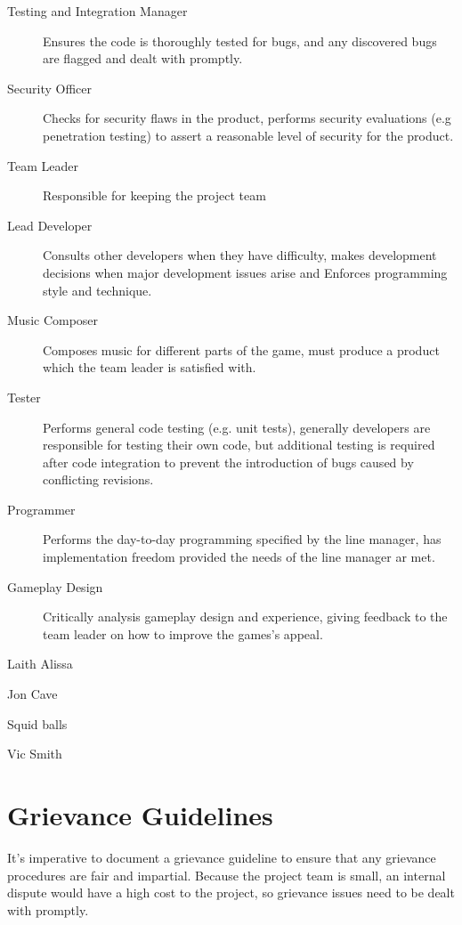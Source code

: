 \begin{description}
\item[Testing and Integration Manager] Ensures the code is thoroughly tested for bugs, and any discovered bugs are flagged and dealt with promptly. 

\item[Security Officer] Checks for security flaws in the product, performs security evaluations (e.g penetration testing) to assert a reasonable level of security for the product.

\item[Team Leader] Responsible for keeping the project team
 
\item[Lead Developer] Consults other developers when they have difficulty, makes development decisions when major development issues arise and Enforces programming style and technique.

\item[Music Composer] Composes music for different parts of the game, must produce a product which the team leader is satisfied with.
\item[Tester] Performs general code testing (e.g. unit tests), generally developers are responsible for testing their own code, but additional testing is required after code integration to prevent the introduction of bugs caused by conflicting revisions.
\item[Programmer] Performs the day-to-day programming specified by the line manager, has implementation freedom provided the needs of the line manager ar met.
\item[Gameplay Design] Critically analysis gameplay design and experience, giving feedback to the team leader on how to improve the games's appeal.
\end{description}

\begin{description}
	\item{Laith Alissa}
	\item{Jon Cave}
	\item{Squid balls}
	\item{Vic Smith}
\end{description}

\section{Grievance Guidelines}
It's imperative to document a grievance guideline to ensure that any grievance procedures are fair and impartial. %
 Because the project team is small, an internal dispute would have a high cost to the project, so grievance issues need to be dealt with promptly. 
 
